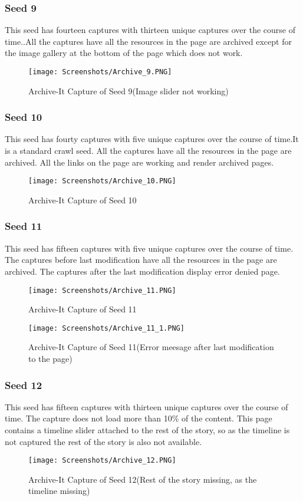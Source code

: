 \documentclass[11pt,journal,compsoc,onecolumn]{IEEEtran}
\begin{document}
\subsubsection{Seed 9}
This seed has fourteen captures with thirteen unique captures over the course of time..All the captures have all the resources in the page are archived except for the image gallery at the bottom of the page which does not work.
 \begin{figure}[ht] 
  \centering
  \texttt{[image: Screenshots/Archive\_9.PNG]}
  \caption{Archive-It Capture of Seed 9(Image slider not working)}
  \label{fig:32}
\end{figure}
\subsubsection{Seed 10}
This seed has fourty captures with five unique captures over the course of time.It is a standard crawl seed. All the captures have all the resources in the page are archived. All the links on the page are working and render archived pages.
 \begin{figure}[ht] 
  \centering
  \texttt{[image: Screenshots/Archive\_10.PNG]}
  \caption{Archive-It Capture of Seed 10}
  \label{fig:33}
\end{figure}
\subsubsection{Seed 11}
This seed has fifteen captures with five unique captures over the course of time. The captures before last modification have all the resources in the page are archived. The captures after the last modification display error denied page. 
 \begin{figure}[ht] 
  \centering
  \texttt{[image: Screenshots/Archive\_11.PNG]}
  \caption{Archive-It Capture of Seed 11}
  \label{fig:34}
\end{figure}
 \begin{figure}[ht] 
  \centering
  \texttt{[image: Screenshots/Archive\_11\_1.PNG]}
  \caption{Archive-It Capture of Seed 11(Error meesage after last modification to the page)}
  \label{fig:35}
\end{figure}
\subsubsection{Seed 12}
This seed has fifteen captures with thirteen unique captures over the course of time. The capture does not load more than 10\% of the content. This page contains a timeline slider attached to the rest of the story, so as the timeline is not captured the rest of the story is also not available. 
 \begin{figure}[ht] 
  \centering
  \texttt{[image: Screenshots/Archive\_12.PNG]}
  \caption{Archive-It Capture of Seed 12(Rest of the story missing, as the timeline missing)}
  \label{fig:35}
\end{figure}
\end{document}

